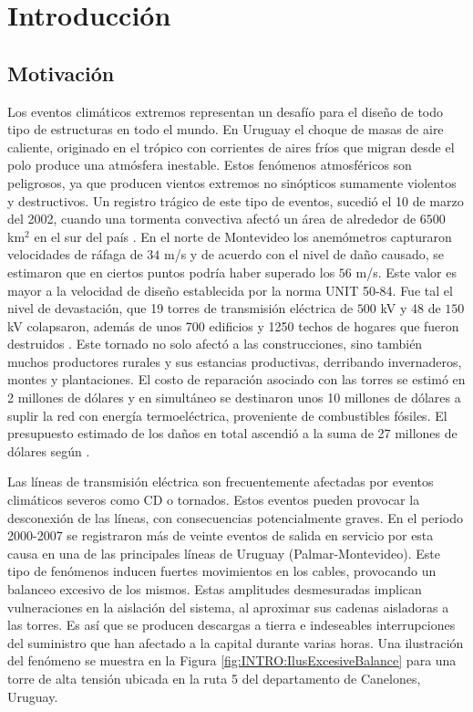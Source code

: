 \chapter{Introducción}\label{Cap:Introduccion}
 
\section{Motivación}
\linenumbers
Los eventos climáticos extremos representan un desafío para el diseño de todo tipo de estructuras en todo el mundo. En Uruguay el choque de masas de aire caliente, originado en el trópico con corrientes de aires fríos que migran desde el polo produce una atmósfera inestable. Estos fenómenos atmosféricos son peligrosos, ya que producen vientos extremos no sinópticos sumamente violentos y destructivos. Un registro trágico de este tipo de eventos, sucedió el 10 de marzo del 2002, cuando una tormenta convectiva afectó un área de alrededor de $6500$ km$^2$ en el sur del país \cite{tormenta2002}. En el norte de Montevideo los anemómetros capturaron velocidades de ráfaga de $34$ m/s y de acuerdo con el nivel de daño causado, se estimaron que en ciertos puntos podría haber superado los $56$ m/s. Este valor es mayor a la velocidad de diseño establecida por la norma UNIT 50-84. Fue tal el nivel de devastación, que 19 torres de transmisión eléctrica de $500$ kV y 48 de $150$ kV colapsaron, además de unos 700 edificios y 1250 techos de hogares que fueron destruidos \citep{duranona2015significance}. Este tornado no solo afectó a las construcciones, sino también muchos productores rurales y sus estancias productivas, derribando invernaderos, montes y plantaciones. El costo de reparación asociado con las torres se estimó en 2 millones de dólares y en simultáneo se destinaron unos 10 millones de dólares a suplir la red con energía termoeléctrica, proveniente de combustibles fósiles. El presupuesto estimado de los daños en total ascendió a la suma de 27 millones de dólares según \cite{duranona2019first}. 

Las líneas de transmisión eléctrica son frecuentemente afectadas por eventos climáticos severos como \gls{CD} o tornados. Estos eventos pueden provocar la desconexión de las líneas, con consecuencias potencialmente graves. En el periodo 2000-2007 se registraron más de veinte eventos de salida en servicio por esta causa en una de las principales líneas de Uruguay (Palmar-Montevideo). Este tipo de fenómenos inducen fuertes movimientos en los cables, provocando un balanceo excesivo de los mismos. Estas amplitudes desmesuradas implican vulneraciones en la aislación del sistema, al aproximar sus cadenas aisladoras a las torres. Es así que se producen descargas a tierra e indeseables interrupciones del suministro que han afectado a la capital durante varias horas. Una ilustración del fenómeno se muestra en la Figura \ref{fig:INTRO:IlusExcesiveBalance} para una torre de alta tensión ubicada en la ruta 5 del departamento de Canelones, Uruguay. 

